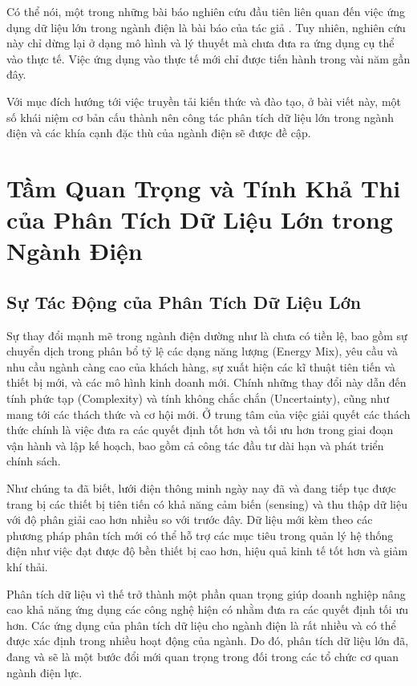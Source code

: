 \documentclass[utf8]{frontiersSCNS} %
\begin{document}
Có thể nói, một trong những bài báo nghiên cứu đầu tiên liên quan đến việc ứng dụng dữ liệu lớn trong ngành điện là bài báo của tác giả \cite{Kezunovic2013}. Tuy nhiên, nghiên cứu này chỉ dừng lại ở dạng mô hình và lý thuyết mà chưa đưa ra ứng dụng cụ thể vào thực tế. Việc ứng dụng vào thực tế mới chỉ được tiến hành trong vài năm gần đây.

Với mục đích hướng tới việc truyền tải kiến thức và đào tạo, ở bài viết này, một số khái niệm cơ bản cấu thành nên công tác phân tích dữ liệu lớn trong ngành điện và các khía cạnh đặc thù của ngành điện sẽ được đề cập. 

\section{Tầm Quan Trọng và Tính Khả Thi của Phân Tích Dữ Liệu Lớn trong Ngành Điện}
\subsection{Sự Tác Động của Phân Tích Dữ Liệu Lớn}

Sự thay đổi mạnh mẽ trong ngành điện dường như là chưa có tiền lệ, bao gồm sự chuyển dịch trong phân bổ tỷ lệ các dạng năng lượng (Energy Mix), yêu cầu và nhu cầu ngành càng cao của khách hàng, sự xuất hiện các kĩ thuật tiên tiến và thiết bị mới, và các mô hình kinh doanh mới. Chính những thay đổi này dẫn đến tính phức tạp (Complexity) và tính không chắc chắn (Uncertainty), cũng như mang tới các thách thức và cơ hội mới. Ở trung tâm của việc giải quyết các thách thức chính là việc đưa ra các quyết định tốt hơn và tối ưu hơn trong giai đoạn vận hành và lập kế hoạch, bao gồm cả công tác đầu tư dài hạn và phát triển chính sách.

Như chúng ta đã biết, lưới điện thông minh ngày nay đã và đang tiếp tục được trang bị các thiết bị tiên tiến có khả năng cảm biến (sensing) và thu thập dữ liệu với độ phân giải cao hơn nhiều so với trước đây. Dữ liệu mới kèm theo các phương pháp phân tích mới có thể hỗ trợ các mục tiêu trong quản lý hệ thống điện như việc đạt được độ bền thiết bị cao hơn, hiệu quả kinh tế tốt hơn và giảm khí thải. 

Phân tích dữ liệu vì thế trở thành một phần quan trọng giúp doanh nghiệp nâng cao khả năng ứng dụng các công nghệ hiện có nhằm đưa ra các quyết định tối ưu hơn. Các ứng dụng của phân tích dữ liệu cho ngành điện là rất nhiều và có thể được xác định trong nhiều hoạt động của ngành. Do đó, phân tích dữ liệu lớn đã, đang và sẽ là một bước đổi mới quan trọng trong đối trong các tổ chức cơ quan ngành điện lực.
\end{document}
